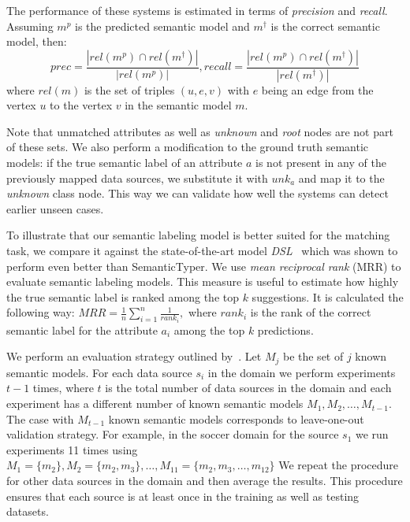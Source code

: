 \documentclass[letterpaper]{article} %
\newcommand{\authornote}[3]{
  {\fbox{\sc 
  #1}:$\blacktriangleright$\textcolor{#2}{\small{#3}}$\blacktriangleleft$}%
}
\newcommand{\npr}[1]{\authornote{NPR}{orange}{#1}}
\newcommand{\ignore}[1]{}
\begin{document}
The performance of these systems is estimated in terms of \emph{precision} and \emph{recall}.
Assuming $m^{p}$ is the predicted semantic model and $m^\dag$ is the correct semantic model, then:
$$\mathit{prec} = \frac{|\mathit{rel}(m^{p})\cap 
\mathit{rel}(m^\dag)|}{|\mathit{rel}(m^{p})|}, 
\mathit{recall} = \frac{|\mathit{rel}(m^{p})\cap 
\mathit{rel}(m^\dag)|}{|\mathit{rel}(m^\dag)|}$$
where $rel(m)$ is the set of triples $(u,e,v)$ with $e$ being an edge from the vertex $u$ to the vertex $v$ in the semantic model $m$.
\ignore{Since we want to estimate the accuracy of both the matching and STP 
parts,
we also include triples for attributes and data nodes into the corresponding 
sets.}
Note that unmatched attributes as well as \emph{unknown} and \emph{root} nodes are not part of these sets.
We also perform a modification to the ground truth semantic models:
if the true semantic label of an attribute $a$ is not present in any of the 
previously mapped data sources, we substitute it with $unk_a$ and map it to the 
\emph{unknown} class node.
This way we can validate how well the systems can detect earlier unseen cases.

To illustrate that our semantic labeling model is better suited for the
matching task, 
we compare it against the state-of-the-art model \emph{DSL}~\cite{Pham:semantic} which was shown to perform 
even better than SemanticTyper. 
We use \emph{mean reciprocal rank} (MRR) to evaluate semantic labeling models.
This measure is useful to estimate how highly the true semantic label is ranked among the top $k$ suggestions.
It is calculated the following way:
$MRR = \frac{1}{n}\sum_{i=1}^{n}{\frac{1}{rank_i}},$
where $rank_i$ is the rank of the correct semantic label for the attribute $a_i$ among the top $k$ predictions.


We perform an evaluation strategy outlined by~\cite{taheriyan2016learning}.
Let $M_j$ be the set of $j$ known semantic models.
For each data source $s_i$ in the domain we perform experiments $t-1$ times,
where $t$ is the total number of data sources in the domain and each experiment has a different number of known semantic models $M_1, M_2, \ldots, M_{t-1}$.
The case with $M_{t-1}$ known semantic models corresponds to leave-one-out validation strategy. 
For example, in the soccer domain for the source $s_1$ we run experiments 11 times using $M_1=\{m_2\}, M_2=\{m_2, m_3\}, \ldots, M_{11}=\{m_2, m_3, \ldots, m_{12}\}$
We repeat the procedure for other data sources in the domain and then average the results.
This procedure ensures that each source is at least once in the training as well as testing datasets.
\end{document}

